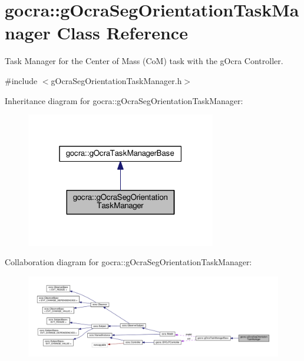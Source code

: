 \hypertarget{classgocra_1_1gOcraSegOrientationTaskManager}{}\section{gocra\+:\+:g\+Ocra\+Seg\+Orientation\+Task\+Manager Class Reference}
\label{classgocra_1_1gOcraSegOrientationTaskManager}


Task Manager for the Center of Mass (CoM) task with the g\+Ocra Controller.  




{\ttfamily \#include $<$g\+Ocra\+Seg\+Orientation\+Task\+Manager.\+h$>$}



Inheritance diagram for gocra\+:\+:g\+Ocra\+Seg\+Orientation\+Task\+Manager\+:
\nopagebreak
\begin{figure}[H]
\begin{center}
\leavevmode
\includegraphics[width=235pt]{d0/d24/classgocra_1_1gOcraSegOrientationTaskManager__inherit__graph}
\end{center}
\end{figure}


Collaboration diagram for gocra\+:\+:g\+Ocra\+Seg\+Orientation\+Task\+Manager\+:
\nopagebreak
\begin{figure}[H]
\begin{center}
\leavevmode
\includegraphics[width=350pt]{de/d46/classgocra_1_1gOcraSegOrientationTaskManager__coll__graph}
\end{center}
\end{figure}
